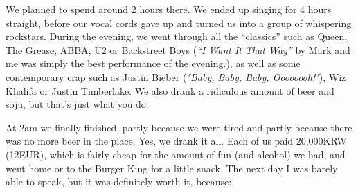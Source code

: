 \begin{post}
\begin{content}


We planned to spend around 2 hours there. We ended up singing for 4 hours straight, before our vocal cords gave up and turned us into a group of whispering rockstars. During the evening, we went through all the ``classics'' such as Queen, The Grease, ABBA, U2 or Backstreet Boys (\textit{``I Want It That Way''} by Mark and me was simply the best performance of the evening.), as well as some contemporary crap such as Justin Bieber (\textit{"Baby, Baby, Baby, Oooooooh!"}), Wiz Khalifa or Justin Timberlake. We also drank a ridiculous amount of beer and soju, but that's just what you do.



At 2am we finally finished, partly because we were tired and partly because there was no more beer in the place. Yes, we drank it all. Each of us paid 20,000KRW (12EUR), which is fairly cheap for the amount of fun (and alcohol) we had, and went home or to the Burger King for a little snack. The next day I was barely able to speak, but it was definitely worth it, because:


\end{content}
\end{post}
